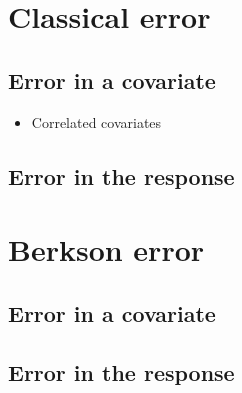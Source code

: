 \documentclass[]{book}
\providecommand{\tightlist}{%
  \setlength{\itemsep}{0pt}\setlength{\parskip}{0pt}}
\theoremstyle{definition}
\theoremstyle{definition}
\theoremstyle{definition}
\theoremstyle{remark}
\begin{document}
\section{Classical error}\label{classical-error}

\subsection{Error in a covariate}\label{error-in-a-covariate}

\begin{itemize}
\tightlist
\item
  Correlated covariates
\end{itemize}

\subsection{Error in the response}\label{error-in-the-response-1}

\section{Berkson error}\label{berkson-error}

\subsection{Error in a covariate}\label{error-in-a-covariate-1}

\subsection{Error in the response}\label{error-in-the-response-2}


\end{document}
